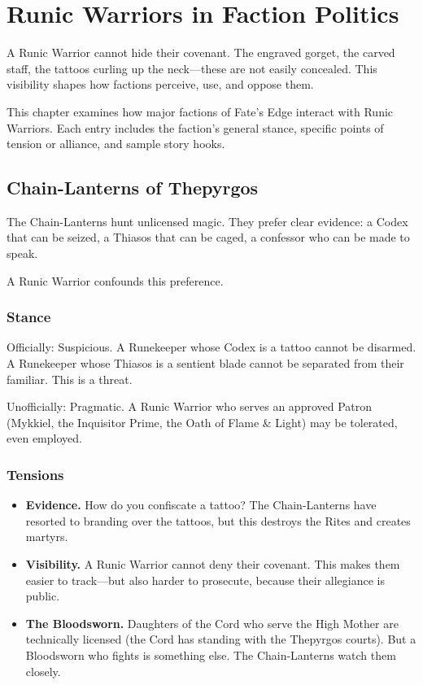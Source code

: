 \section{Runic Warriors in Faction Politics}

A Runic Warrior cannot hide their covenant. The engraved gorget, the carved staff, the tattoos curling up the neck—these are not easily concealed. This visibility shapes how factions perceive, use, and oppose them.

This chapter examines how major factions of Fate's Edge interact with Runic Warriors. Each entry includes the faction's general stance, specific points of tension or alliance, and sample story hooks.

\subsection{Chain-Lanterns of Thepyrgos}

The Chain-Lanterns hunt unlicensed magic. They prefer clear evidence: a Codex that can be seized, a Thiasos that can be caged, a confessor who can be made to speak.

A Runic Warrior confounds this preference.

\subsubsection{Stance}

Officially: Suspicious. A Runekeeper whose Codex is a tattoo cannot be disarmed. A Runekeeper whose Thiasos is a sentient blade cannot be separated from their familiar. This is a threat.

Unofficially: Pragmatic. A Runic Warrior who serves an approved Patron (Mykkiel, the Inquisitor Prime, the Oath of Flame \& Light) may be tolerated, even employed.

\subsubsection{Tensions}

\begin{itemize}
\item \textbf{Evidence.} How do you confiscate a tattoo? The Chain-Lanterns have resorted to branding over the tattoos, but this destroys the Rites and creates martyrs.
\item \textbf{Visibility.} A Runic Warrior cannot deny their covenant. This makes them easier to track—but also harder to prosecute, because their allegiance is public.
\item \textbf{The Bloodsworn.} Daughters of the Cord who serve the High Mother are technically licensed (the Cord has standing with the Thepyrgos courts). But a Bloodsworn who fights is something else. The Chain-Lanterns watch them closely.
\end{itemize}

